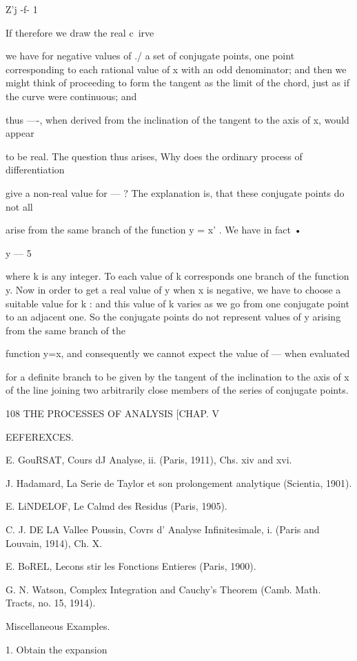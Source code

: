 {{{{Z'j -f- 1

If therefore we draw the real c\ irve

we have for negative values of ./ a set of conjugate points, one point
corresponding to each rational value of x with an odd denominator;
and then we might think of proceeding to form the tangent as the limit
of the chord, just as if the curve were continuous; and

thus —-, when derived from the inclination of the tangent to the axis
of x, would appear

to be real. The question thus arises, Why does the ordinary process of
differentiation

give a non-real value for — ? The explanation is, that these conjugate
points do not all

arise from the same branch of the function y = x' . We have in fact •

y — 5

where k is any integer. To each value of k corresponds one branch of
the function y. Now in order to get a real value of y when x is
negative, we have to choose a suitable value for k : and this value of
k varies as we go from one conjugate point to an adjacent one. So the
conjugate points do not represent values of y arising from the same
branch of the

function y=x, and consequently we cannot expect the value of — when
evaluated

for a definite branch to be given by the tangent of the inclination to
the axis of x of the line joining two arbitrarily close members of the
series of conjugate points.

108 THE PROCESSES OF ANALYSIS [CHAP. V

EEFEREXCES.

E. GouRSAT, Cours dJ Analyse, ii. (Paris, 1911), Chs. xiv and xvi.

J. Hadamard, La Serie de Taylor et son prolongement analytique
(Scientia, 1901).

E. LiNDELOF, Le Calmd des Residus (Paris, 1905).

C. J. DE LA Vallee Poussin, Covrs d' Analyse Infinitesimale, i. (Paris
and Louvain, 1914), Ch. X.

E. BoREL, Lecons stir les Fonctions Entieres (Paris, 1900).

G. N. Watson, Complex Integration and Cauchy's Theorem (Camb. Math.
Tracts, no. 15, 1914).

Miscellaneous Examples.

1. Obtain the expansion

}}}}
